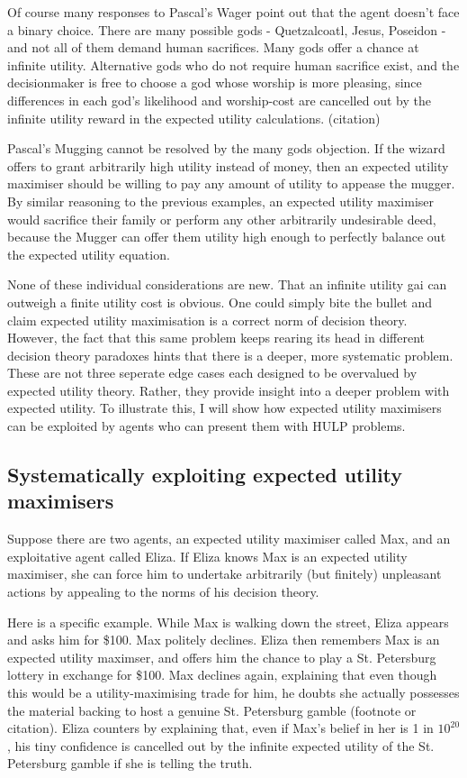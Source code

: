\documentclass{article}
\begin{document}
Of course many responses to Pascal's Wager point out that the agent doesn't face a binary choice. There are many possible gods - Quetzalcoatl, Jesus, Poseidon - and not all of them demand human sacrifices. Many gods offer a chance at infinite utility. Alternative gods who do not require human sacrifice exist, and the decisionmaker is free to choose a god whose worship is more pleasing, since differences in each god's likelihood and worship-cost are cancelled out by the infinite utility reward in the expected utility calculations. (citation)

Pascal's Mugging cannot be resolved by the many gods objection. If the wizard offers to grant arbitrarily high utility instead of money, then an expected utility maximiser should be willing to pay any amount of utility to appease the mugger. By similar reasoning to the previous examples, an expected utility maximiser would sacrifice their family or perform any other arbitrarily undesirable deed, because the Mugger can offer them utility high enough to perfectly balance out the expected utility equation.

None of these individual considerations are new. That an infinite utility gai can outweigh a finite utility cost is obvious. One could simply bite the bullet and claim expected utility maximisation is a correct norm of decision theory. However, the fact that this same problem keeps rearing its head in different decision theory paradoxes hints that there is a deeper, more systematic problem. These are not three seperate edge cases each designed to be overvalued by expected utility theory. Rather, they provide insight into a deeper problem with expected utility. To illustrate this, I will show how expected utility maximisers can be exploited by agents who can present them with HULP problems.

\subsection{Systematically exploiting expected utility maximisers}

Suppose there are two agents, an expected utility maximiser called Max, and an exploitative agent called Eliza. If Eliza knows Max is an expected utility maximiser, she can force him to undertake arbitrarily (but finitely) unpleasant actions by appealing to the norms of his decision theory. 

Here is a specific example. While Max is walking down the street, Eliza appears and asks him for \$100. Max politely declines. Eliza then remembers Max is an expected utility maximser, and offers him the chance to play a St. Petersburg lottery in exchange for \$100. Max declines again, explaining that even though this would be a utility-maximising trade for him, he doubts she actually possesses the material backing to host a genuine St. Petersburg gamble (footnote or citation). Eliza counters by explaining that, even if Max's belief in her is 1 in \(10^{20}\), his tiny confidence is cancelled out by the infinite expected utility of the St. Petersburg gamble if she is telling the truth.
\end{document}
